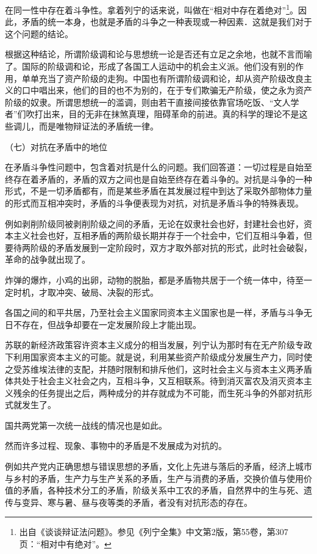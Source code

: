 \documentclass[UTF8, 12pt, a4paper]{ctexrep}
\begin{document}
在同一性中存在着斗争性。拿着列宁的话来说，叫做在“相对中存在着绝对”\footnote{出自《谈谈辩证法问题》。参见《列宁全集》中文第2版，第55卷，第307页：“相对中有绝对”。}。因此，矛盾的统一本身，也就是矛盾的斗争之一种表现或一种因素．这就是我们对于这个问题的结论。

根据这种结论，所谓阶级调和论与思想统一论是否还有立足之余地，也就不言而喻了。国际的阶级调和论，形成了各国工人运动中的机会主义派。他们没有别的作用，单单充当了资产阶级的走狗。中国也有所谓阶级调和论，却从资产阶级改良主义的口中唱出来，他们的目的也不为别的，在于专们欺骗无产阶级，使之永为资产阶级的奴隶。所谓思想统一的滥调，则由若干直接间接依靠官场吃饭、“文人学者”们吹打出来，目的无非在抹煞真理，阻碍革命的前进。真的科学的理论不是这些调儿，而是唯物辩证法的矛盾统一律。

（七）对抗在矛盾中的地位

在矛盾斗争性问题中，包含着对抗是什么的问题。我们回答道：一切过程是自始至终存在着矛盾的，矛盾的双方之间也是自始至终存在着斗争的。对抗是斗争的一种形式，不是一切矛盾都有，而是某些矛盾在其发展过程中到达了采取外部物体力量的形式而互相冲突时，矛盾的斗争便表现为对抗，对抗是矛盾斗争的特殊表现。

例如剥削阶级同被剥削阶级之间的矛盾，无论在奴隶社会也好，封建社会也好，资本主义社会也好，互相矛盾的两阶级长期并存于一个社会中，它们互相斗争着，但要待两阶级的矛盾发展到一定阶段时，双方才取外部对抗的形式，此时社会破裂，革命的战争就出现了。

炸弹的爆炸，小鸡的出卵，动物的脱胎，都是矛盾物共居于一个统一体中，待至一定时机，才取冲突、破局、决裂的形式。

各国之间的和平共居，乃至社会主义国家同资本主义国家也是一样，矛盾与斗争无日不存在，但战争却要在一定发展阶段上才能出现。

苏联的新经济政策容许资本主义成分的相当发展，列宁认为那时有在无产阶级专政下利用国家资本主义的可能。就是说，利用某些资产阶级成分发展生产力，同时使之受苏维埃法律的支配，并随时限制和排斥他们，这时社会主义与资本主义两矛盾体共处于社会主义社会之内，互相斗争，又互相联系。待到消灭富农及消灭资本主义残余的任务提出之后，两种成分的并存就成为不可能，而生死斗争的外部对抗形式就发生了。

国共两党第一次统一战线的情况也是如此。

然而许多过程、现象、事物中的矛盾是不发展成为对抗的。

例如共产党内正确思想与错误思想的矛盾，文化上先进与落后的矛盾，经济上城市与乡村的矛盾，生产力与生产关系的矛盾，生产与消费的矛盾，交换价值与使用价值的矛盾，各种技术分工的矛盾，阶级关系中工农的矛盾，自然界中的生与死、遗传与变异、寒与暑、昼与夜等类的矛盾，者没有对抗形态的存在。
\end{document}
